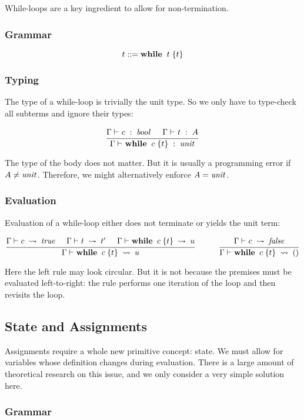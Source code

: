 While-loops are a key ingredient to allow for non-termination.

\subsubsection{Grammar}

\[t\bbc \awhileI{t}{t}\]

\subsubsection{Typing}

The type of a while-loop is trivially the unit type.
So we only have to type-check all subterms and ignore their types:

\[\rul{\oftype{}{\Gamma}{c}{\Bool}\tb \oftype{}{\Gamma}{t}{A}}
      {\oftype{}{\Gamma}{\awhileI{c}{t}}{\Unit}}
\]

The type of the body does not matter.
But it is usually a programming error if $A\neq \mathit{unit}$.
Therefore, we might alternatively enforce $A=\mathit{unit}$.

\subsubsection{Evaluation}

Evaluation of a while-loop either does not terminate or yields the unit term:

\[\rul{\evobj{}{\Gamma}{c}{\true}\tb \evobj{}{\Gamma}{t}{t'} \tb \evobj{}{\Gamma}{\awhileI{c}{t}}{u}}
      {\evobj{}{\Gamma}{\awhileI{c}{t}}{u}}
\tb\tb
\rul{\evobj{}{\Gamma}{c}{\false}}
      {\evobj{}{\Gamma}{\awhileI{c}{t}}{()}}
\]

Here the left rule may look circular.
But it is not because the premises must be evaluated left-to-right: the rule performs one iteration of the loop and then revisits the loop.


\subsection{State and Assignments}

Assignments require a whole new primitive concept: state.
We must allow for variables whose definition changes during evaluation.
There is a large amount of theoretical research on this issue, and we only consider a very simple solution here.

\subsubsection{Grammar}

